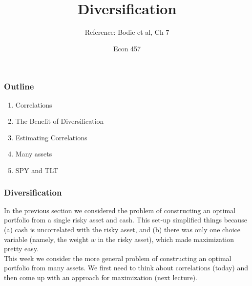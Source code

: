 \documentclass{beamer}
\title{Diversification}
\subtitle{Reference: Bodie et al, Ch 7}
\author{Econ 457}
\date{\week}
\begin{document}
\frame{\titlepage}

\begin{frame}
    \frametitle{Outline}

    \begin{enumerate}
        \item Correlations
        \item The Benefit of Diversification
        \item Estimating Correlations
        \item Many assets
        \item SPY and TLT
    \end{enumerate}
\end{frame}

\begin{frame}[t]
    \frametitle{Diversification}

    In the previous section we considered the problem of constructing an optimal portfolio from a single risky asset and cash.   This set-up simplified things because (a) cash is uncorrelated with the risky asset, and (b) there was only one choice variable (namely, the weight $w$ in the risky asset), which made maximization pretty easy.\\
    \vspace{1em}
    This week we consider the more general problem of constructing an optimal portfolio from many assets.   We first need to think about correlations (today) and then come up with an approach for maximization (next lecture).

\end{frame}
\end{document}

